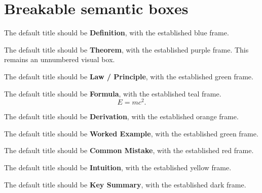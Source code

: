 \documentclass{otscience}
\begin{document}
\maketitle

\section{Breakable semantic boxes}

\begin{definitionbox}
    The default title should be \textbf{Definition}, with the established
    blue frame.
\end{definitionbox}

\begin{theorembox}
    The default title should be \textbf{Theorem}, with the established
    purple frame. This remains an unnumbered visual box.
\end{theorembox}

\begin{lawbox}
    The default title should be \textbf{Law / Principle}, with the
    established green frame.
\end{lawbox}

\begin{formulabox}
    The default title should be \textbf{Formula}, with the established
    teal frame.
    \[
        E=mc^2.
    \]
\end{formulabox}

\begin{derivationbox}
    The default title should be \textbf{Derivation}, with the established
    orange frame.
\end{derivationbox}

\begin{examplebox}
    The default title should be \textbf{Worked Example}, with the
    established green frame.
\end{examplebox}

\begin{warningbox}
    The default title should be \textbf{Common Mistake}, with the
    established red frame.
\end{warningbox}

\begin{intuitionbox}
    The default title should be \textbf{Intuition}, with the established
    yellow frame.
\end{intuitionbox}

\begin{summarybox}
    The default title should be \textbf{Key Summary}, with the established
    dark frame.
\end{summarybox}
\end{document}

